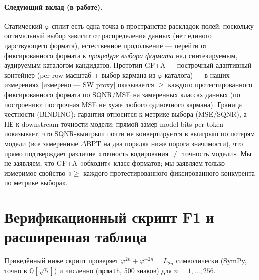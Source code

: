 \documentclass[11pt,a4paper]{article}
\theoremstyle{plain}
\begin{document}
\paragraph{Следующий вклад (в работе).}
Статический \(\varphi\)-сплит есть одна точка в пространстве раскладок полей;
поскольку оптимальный выбор зависит от распределения данных (нет
единого царствующего формата), естественное продолжение --- перейти
от фиксированного формата к \emph{процедуре выбора формата} над синтезируемым,
аудируемым каталогом кандидатов. Прототип GF+A --- построчный
адаптивный контейнер (per-row масштаб + выбор кармана из
\(\varphi\)-каталога) --- в наших измерениях [измерено --- SW proxy]
оказывается \(\ge\) каждого протестированного фиксированного
формата по SQNR/MSE на замеренных классах данных (по построению:
построчная MSE не хуже любого одиночного кармана). Граница
честности (BINDING): гарантия относится к метрике выбора
(MSE/SQNR), а НЕ к downstream-точности модели: прямой замер model
bits-per-token показывает, что SQNR-выигрыш почти не
конвертируется в выигрыш по потерям модели (все замеренные
\(\Delta\)BPT на два порядка ниже порога значимости), что прямо
подтверждает различие «точность кодирования \(\neq\) точность модели».
Мы не заявляем, что GF+A «обходит» класс форматов; мы заявляем
только измеримое свойство «\(\ge\) каждого протестированного
фиксированного конкурента по метрике выбора».

\appendix

\section{Верификационный скрипт F1 и расширенная таблица}\label{app:f1}

Приведённый ниже скрипт проверяет \(\varphi^{2n} + \varphi^{-2n} = L_{2n}\)
символически (SymPy, точно в \(\mathbb{Q}[\sqrt{5}]\)) и численно
(\texttt{mpmath}, 500 знаков) для \(n = 1,\dots,256\).
\end{document}
